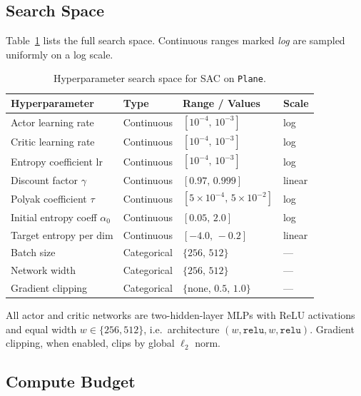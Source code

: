 \subsection*{Search Space}

Table~\ref{tab:hp_space} lists the full search space.
Continuous ranges marked \emph{log} are sampled uniformly on a log scale.

\begin{table}[h]
\centering
\caption{Hyperparameter search space for SAC on \texttt{Plane}.}
\label{tab:hp_space}
\begin{tabular}{llll}
\toprule
\textbf{Hyperparameter} & \textbf{Type} & \textbf{Range / Values} & \textbf{Scale} \\
\midrule
Actor learning rate       & Continuous & $[10^{-4},\, 10^{-3}]$    & log   \\
Critic learning rate      & Continuous & $[10^{-4},\, 10^{-3}]$    & log   \\
Entropy coefficient lr    & Continuous & $[10^{-4},\, 10^{-3}]$    & log   \\
Discount factor $\gamma$  & Continuous & $[0.97,\, 0.999]$          & linear\\
Polyak coefficient $\tau$ & Continuous & $[5\times10^{-4},\, 5\times10^{-2}]$ & log \\
Initial entropy coeff $\alpha_0$ & Continuous & $[0.05,\, 2.0]$      & log   \\
Target entropy per dim    & Continuous & $[-4.0,\, -0.2]$           & linear\\
Batch size                & Categorical & $\{256,\, 512\}$          & —     \\
Network width             & Categorical & $\{256,\, 512\}$          & —     \\
Gradient clipping         & Categorical & $\{\text{none},\, 0.5,\, 1.0\}$ & — \\
\bottomrule
\end{tabular}
\end{table}

All actor and critic networks are two-hidden-layer MLPs with ReLU activations and
equal width $w \in \{256, 512\}$, i.e.\ architecture $(w, \texttt{relu}, w,
\texttt{relu})$.
Gradient clipping, when enabled, clips by global $\ell_2$ norm.

\subsection*{Compute Budget}

